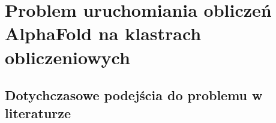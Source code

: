 \chapter{Problem uruchomiania obliczeń AlphaFold na klastrach obliczeniowych}


\section{Dotychczasowe podejścia do problemu w literaturze}